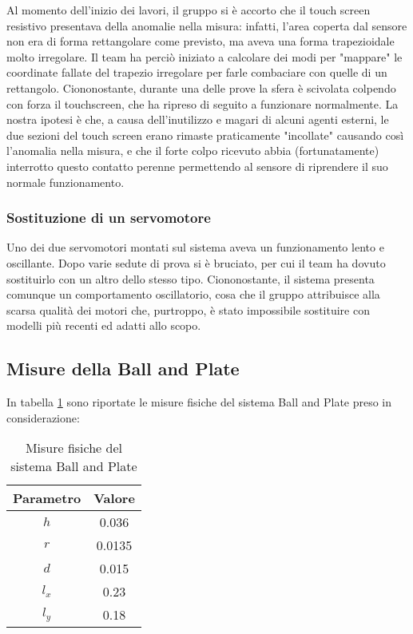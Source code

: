 Al momento dell'inizio dei lavori, il gruppo si è accorto che il touch screen resistivo presentava della anomalie nella misura: infatti, l'area coperta dal sensore non era di forma rettangolare come previsto, ma aveva una forma trapezioidale molto irregolare. Il team ha perciò iniziato a calcolare dei modi per "mappare" le coordinate fallate del trapezio irregolare per farle combaciare con quelle di un rettangolo. Ciononostante, durante una delle prove la sfera è scivolata colpendo con forza il touchscreen, che ha ripreso di seguito a funzionare normalmente. La nostra ipotesi è che, a causa dell'inutilizzo e magari di alcuni agenti esterni, le due sezioni del touch screen erano rimaste praticamente "incollate" causando così l'anomalia nella misura, e che il forte colpo ricevuto abbia (fortunatamente) interrotto questo contatto perenne permettendo al sensore di riprendere il suo normale funzionamento.

\subsubsection{Sostituzione di un servomotore}

Uno dei due servomotori montati sul sistema aveva un funzionamento lento e oscillante. Dopo varie sedute di prova si è bruciato, per cui il team ha dovuto sostituirlo con un altro dello stesso tipo. Ciononostante, il sistema presenta comunque un comportamento oscillatorio, cosa che il gruppo attribuisce alla scarsa qualità dei motori che, purtroppo, è stato impossibile sostituire con modelli più recenti ed adatti allo scopo.

\subsection{Misure della Ball and Plate}

In tabella \ref{table:misure} sono riportate le misure fisiche del sistema Ball and Plate preso in considerazione:

\begin{table}[ht]
	\centering
	\begin{tabular}{|c|c|}
		\hline
		\rowcolor[HTML]{C0C0C0} 
		Parametro 		& Valore   \\ \hline
		$h$         	& 0.036    \\ \hline
		$r$         	& 0.0135   \\ \hline
		$d$         	& 0.015    \\ \hline
		$l_{x}$     	& 0.23     \\ \hline
		$l_{y}$     	& 0.18     \\ \hline
	\end{tabular}
	\caption{Misure fisiche del sistema Ball and Plate}
	\label{table:misure}
\end{table}

